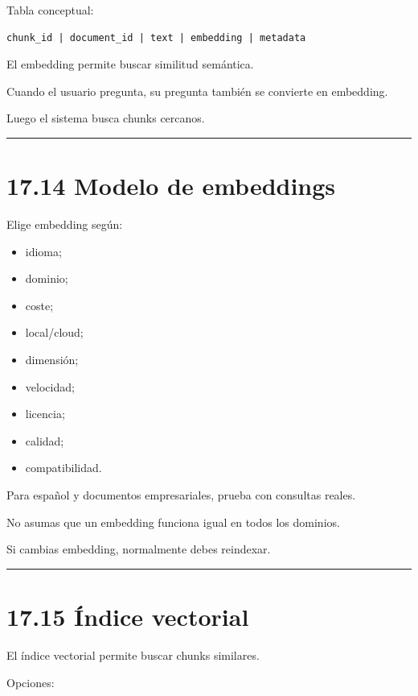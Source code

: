 Tabla conceptual:

\begin{lstlisting}
chunk_id | document_id | text | embedding | metadata
\end{lstlisting}

El embedding permite buscar similitud semántica.

Cuando el usuario pregunta, su pregunta también se convierte en
embedding.

Luego el sistema busca chunks cercanos.

\begin{center}\rule{0.5\linewidth}{0.5pt}\end{center}

\section{17.14 Modelo de embeddings}\label{modelo-de-embeddings}

Elige embedding según:

\begin{itemize}
\tightlist
\item
  idioma;
\item
  dominio;
\item
  coste;
\item
  local/cloud;
\item
  dimensión;
\item
  velocidad;
\item
  licencia;
\item
  calidad;
\item
  compatibilidad.
\end{itemize}

Para español y documentos empresariales, prueba con consultas reales.

No asumas que un embedding funciona igual en todos los dominios.

Si cambias embedding, normalmente debes reindexar.

\begin{center}\rule{0.5\linewidth}{0.5pt}\end{center}

\section{17.15 Índice vectorial}\label{uxedndice-vectorial}

El índice vectorial permite buscar chunks similares.

Opciones:

